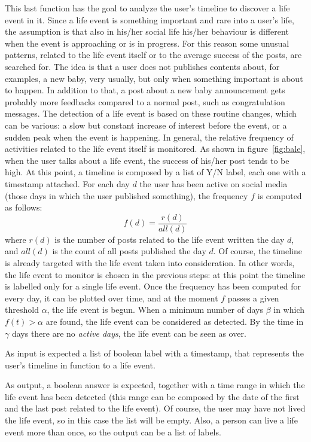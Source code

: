 This last function has the goal to analyze the user's timeline to discover a life event in it. Since a life event is something important and rare into a user's life, the assumption is that also in his/her social life his/her behaviour is different when the event is approaching or is in progress. For this reason some unusual patterns, related to the life event itself or to the average success of the posts, are searched for. The idea is that a user does not publishes contents about, for examples, a new baby, very usually, but only when something important is about to happen. In addition to that, a post about a new baby announcement gets probably more feedbacks compared to a normal post, such as congratulation messages. The detection of a life event is based on these routine changes, which can be various: a slow but constant increase of interest before the event, or a sudden peak when the event is happening. In general, the relative frequency of activities related to the life event itself is monitored. As shown in figure~\ref{fig:bale}, when the user talks about a life event, the success of his/her post tends to be high.
At this point, a timeline is composed by a list of Y/N label, each one with a timestamp attached. For each day $d$ the user has been active on social media (those days in which the user published something), the frequency $f$ is computed as follows:
\[
f(d) = \frac{r(d)}{all(d)}
\]
where $r(d)$ is the number of posts related to the life event written the day $d$, and $all(d)$ is the count of all posts published the day $d$. Of course, the timeline is already targeted with the life event taken into consideration. In other words, the life event to monitor is chosen in the previous steps: at this point the timeline is labelled only for a single life event. Once the frequency has been computed for every day, it can be plotted over time, and at the moment $f$ passes a given threshold $\alpha$, the life event is begun. When a minimum number of days $\beta$ in which $f(t) > \alpha$ are found, the life event can be considered as detected. By the time in $\gamma$ days there are no \textit{active days}, the life event can be seen as over.

As input is expected a list of boolean label with a timestamp, that represents the user's timeline in function to a life event.

As output, a boolean answer is expected, together with a time range in which the life event has been detected (this range can be composed by the date of the first and the last post related to the life event). Of course, the user may have not lived the life event, so in this case the list will be empty. Also, a person can live a life event more than once, so the output can be a list of labels.

